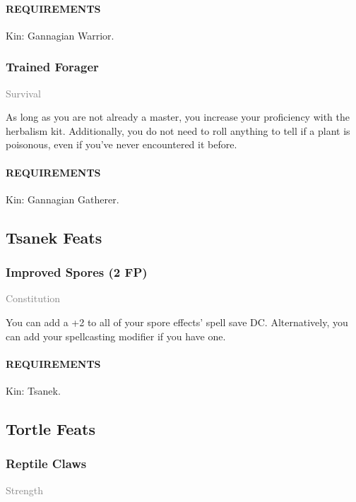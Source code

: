     \paragraph{REQUIREMENTS} Kin: Gannagian Warrior.

    \subsubsection{Trained Forager} \label{feat::trainedforager}
    \small{\textcolor{gray}{Survival}}

    \normalsize
    As long as you are not already a master, you increase your proficiency with the herbalism kit.
    Additionally, you do not need to roll anything to tell if a plant is poisonous, even if you've never encountered it before.
    \paragraph{REQUIREMENTS} Kin: Gannagian Gatherer.

\subsection*{Tsanek Feats}
    \subsubsection{Improved Spores (2 FP)} \label{feat::improvedspores}
    \small{\textcolor{gray}{Constitution}}

    \normalsize
    You can add a +2 to all of your spore effects' spell save DC.
    Alternatively, you can add your spellcasting modifier if you have one.
    \paragraph{REQUIREMENTS} Kin: Tsanek.

\subsection*{Tortle Feats}
    \subsubsection{Reptile Claws} \label{feat::reptileclaws}
    \small{\textcolor{gray}{Strength}}

